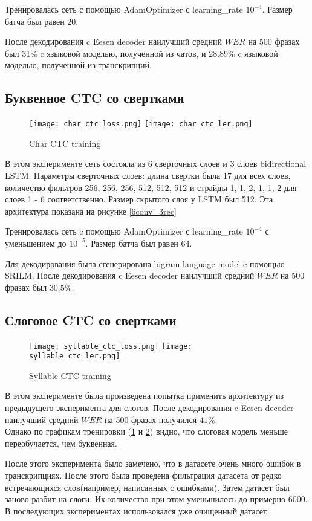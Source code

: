 \documentclass[a4paper,14pt]{extarticle}
\begin{document}
Тренировалась сеть с помощью AdamOptimizer с learning\_rate $10^{-4}$. Размер батча был равен 20. 

После декодирования c Eesen decoder наилучший средний $WER$ на 500 фразах был 31\% c языковой моделью, полученной из чатов, и 28.89\% c языковой моделью, полученной из транскрипций.
\subsection{Буквенное CTC со свертками}
\begin{figure}[!h]
	\texttt{[image: char\_ctc\_loss.png]}%
	\texttt{[image: char\_ctc\_ler.png]}
	\caption{Char CTC training}
	\label{char_train}
\end{figure}
В этом эксперименте сеть состояла из 6 сверточных слоев и 3 слоев bidirectional LSTM. Параметры сверточных слоев: длина свертки была 17 для всех слоев, количество фильтров 256, 256, 256, 512, 512, 512 и страйды 1, 1, 2, 1, 1, 2 для слоев 1 - 6 соответственно. Размер скрытого слоя у LSTM был 512. Эта архитектура показана на рисунке \ref{6conv_3rec}

Тренировалась сеть c помощью AdamOptimizer с learning\_rate $10^{-4}$ с уменьшением до $10^{-5}$. Размер батча был равен 64.
 
Для декодирования была сгенерирована bigram language model c помощью SRILM. После декодирования c Eesen decoder наилучший средний $WER$ на 500 фразах был $30.5 \%$.

\subsection{Слоговое CTC со свертками}
\begin{figure}[!h]
	\texttt{[image: syllable\_ctc\_loss.png]}%
	\texttt{[image: syllable\_ctc\_ler.png]}
	\caption{Syllable CTC training}
	\label{syllable_train}
\end{figure}
В этом эксперименте была произведена попытка применить архитектуру из предыдущего эксперимента для слогов. После декодирования c Eesen decoder наилучший средний $WER$ на 500 фразах получился $41\%$.\\ Однако по графикам тренировки (\ref{char_train} и \ref{syllable_train}) видно, что слоговая модель меньше переобучается, чем буквенная.

После этого эксперимента было замечено, что в датасете очень много ошибок в транскрипциях. После этого была проведена фильтрация датасета от редко встречающихся слов(например, написанных с ошибками). Затем датасет был заново разбит на слоги. Их количество при этом уменьшилось до примерно 6000. В последующих экспериментах использовался уже очищенный датасет.
\end{document}
